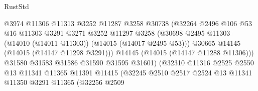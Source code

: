 \begin{lexlean}{RustStd}
\begin{coremodule}
                                        @3974
                                        @11306
                                        @11313
                                        @3252
                                        @11287
                                        @3258
                                        @30738
                                        (@32264
                                          @2496
                                          @106
                                          @53
                                          @16
                                          @11303
                                          @3291
                                          @3271
                                          @3252
                                          @11297
                                          @3258
                                          (@30698
                                            @2495
                                            @11303
                                            (@14010 (@14011 @11303))
                                            (@14015 (@14017 @2495 @53)))
                                          @30665
                                          @14145
                                          (@14015 (@14147 @11298 @3291)))
                                        @14145
                                        (@14015 (@14147 @11288 @11306)))
                                      @31580
                                      @31583
                                      @31586
                                      @31590
                                      @31595
                                      @31601)
                                    (@32310
                                      @11316
                                      @2525
                                      @2550
                                      @13
                                      @11341
                                      @11365
                                      @11391
                                      @11415
                                      (@32245
                                        @2510
                                        @2517
                                        @2524
                                        @13
                                        @11341
                                        @11350
                                        @3291
                                        @11365
                                        (@32256
                                          @2509

\end{coremodule}
\end{lexlean}
